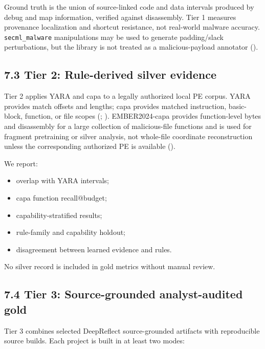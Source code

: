 \documentclass[
  10pt,
]{article}
\providecommand{\tightlist}{%
  \setlength{\itemsep}{0pt}\setlength{\parskip}{0pt}}
\begin{document}
Ground truth is the union of source-linked code and data intervals
produced by debug and map information, verified against disassembly.
Tier 1 measures provenance localization and shortcut resistance, not
real-world malware accuracy. \texttt{secml\_malware} manipulations may
be used to generate padding/slack perturbations, but the library is not
treated as a malicious-payload annotator
().

\subsection{7.3 Tier 2: Rule-derived silver
evidence}\label{tier-2-rule-derived-silver-evidence}

Tier 2 applies YARA and capa to a legally authorized local PE corpus.
YARA provides match offsets and lengths; capa provides matched
instruction, basic-block, function, or file scopes
(;
).
EMBER2024-capa provides function-level bytes and disassembly for a large
collection of malicious-file functions and is used for fragment
pretraining or silver analysis, not whole-file coordinate reconstruction
unless the corresponding authorized PE is available
().

We report:

\begin{itemize}
\tightlist
\item
  overlap with YARA intervals;
\item
  capa function recall@budget;
\item
  capability-stratified results;
\item
  rule-family and capability holdout;
\item
  disagreement between learned evidence and rules.
\end{itemize}

No silver record is included in gold metrics without manual review.

\subsection{7.4 Tier 3: Source-grounded analyst-audited
gold}\label{tier-3-source-grounded-analyst-audited-gold}

Tier 3 combines selected DeepReflect source-grounded artifacts with
reproducible source builds. Each project is built in at least two modes:
\end{document}

